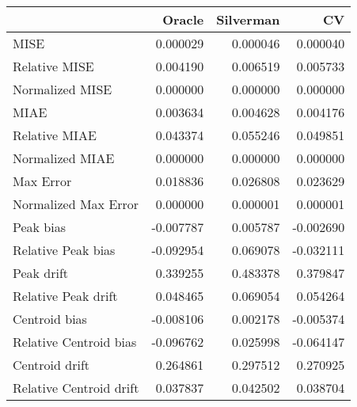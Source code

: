 \begin{tabular}{lrrr}
  \hline
 & Oracle & Silverman & CV \\ 
  \hline
MISE & 0.000029 & 0.000046 & 0.000040 \\ 
  Relative MISE & 0.004190 & 0.006519 & 0.005733 \\ 
  Normalized MISE & 0.000000 & 0.000000 & 0.000000 \\ 
  MIAE & 0.003634 & 0.004628 & 0.004176 \\ 
  Relative MIAE & 0.043374 & 0.055246 & 0.049851 \\ 
  Normalized MIAE & 0.000000 & 0.000000 & 0.000000 \\ 
  Max Error & 0.018836 & 0.026808 & 0.023629 \\ 
  Normalized Max Error & 0.000000 & 0.000001 & 0.000001 \\ 
  Peak bias & -0.007787 & 0.005787 & -0.002690 \\ 
  Relative Peak bias & -0.092954 & 0.069078 & -0.032111 \\ 
  Peak drift & 0.339255 & 0.483378 & 0.379847 \\ 
  Relative Peak drift & 0.048465 & 0.069054 & 0.054264 \\ 
  Centroid bias & -0.008106 & 0.002178 & -0.005374 \\ 
  Relative Centroid bias & -0.096762 & 0.025998 & -0.064147 \\ 
  Centroid drift & 0.264861 & 0.297512 & 0.270925 \\ 
  Relative Centroid drift & 0.037837 & 0.042502 & 0.038704 \\ 
   \hline
\end{tabular}
